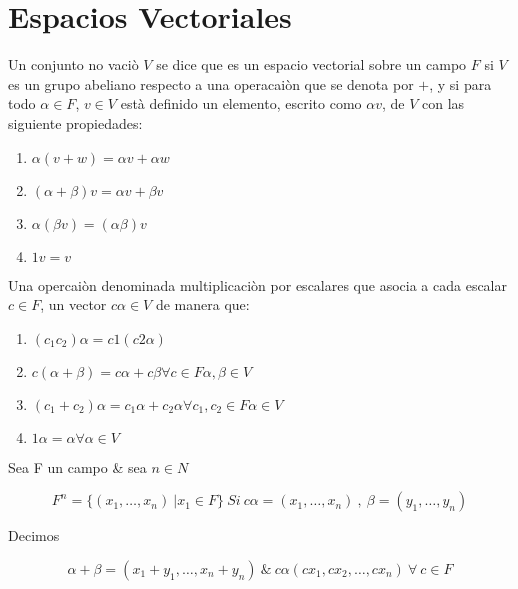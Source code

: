 \newpage 
\section{Espacios Vectoriales}

	\begin{definicion}

Un conjunto no vaci\`o $V$  se dice que es un espacio vectorial sobre un campo $F$ si $V$ es un grupo abeliano respecto a una operacai\`on que se denota por $+$, y si para todo $\alpha \in F$, $v\in V$ est\`a definido un elemento, escrito como $\alpha v$, de $V$ con las siguiente propiedades: 
\end{definicion}
 \begin{enumerate}
  \item $\alpha (v+w)=\alpha v+\alpha w$
  \item $(\alpha+\beta )v=\alpha v+\beta v$
  \item $\alpha(\beta v)=(\alpha\beta)v$
  \item $1v=v$
\end{enumerate}

Una opercai\`on denominada multiplicaci\`on por escalares que asocia a cada escalar $c\in F  $, un vector $c \alpha \in V$ de manera que:

\begin{enumerate}[a]
	\item $( c_1 c_2 ) \alpha = c1 ( c2 \alpha )$
	\item $c ( \alpha + \beta ) = c \alpha + c \beta \forall c \in F \alpha,\beta \in V$
	\item $(c_1 + c_2 ) \alpha = c_1  \alpha + c_2 \alpha \forall c_1 , c_2 \in F \alpha \in V$
	\item $ 1 \alpha = \alpha \forall \alpha \in V$	
\end{enumerate}
		
		\begin{definicion}
		Sea F un campo \& sea $n \in N$
		\end{definicion}		
		
		\begin{equation}
		F^n = \{ ( x_1 , \dots  , x_n) \ | x_1 \in F \} \ 
		Si  \ c \alpha = ( x_1 , \dots , x_n ) \ , \ \beta = ( y_1 , \dots , y_n )		
		\end{equation}
		
		Decimos 
		
		\begin{equation}
		\alpha + \beta = ( x_1 + y_1 , \dots , x_n + y_n  ) \ \&  \ c\alpha ( c x_1 ,c x_2 , 		\dots , c x_n ) \ \forall \ c \in F
		\end{equation}				
		
